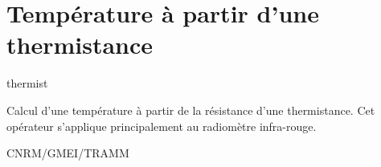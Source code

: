 %
\section{Temp\'erature \`a partir d'une thermistance}

 {\sf thermist}

Calcul d'une temp\'erature \`a partir de la r\'esistance
d'une thermistance. Cet op\'erateur s'applique principalement
au radiom\`etre infra-rouge. 

\bigskip





CNRM/GMEI/TRAMM

